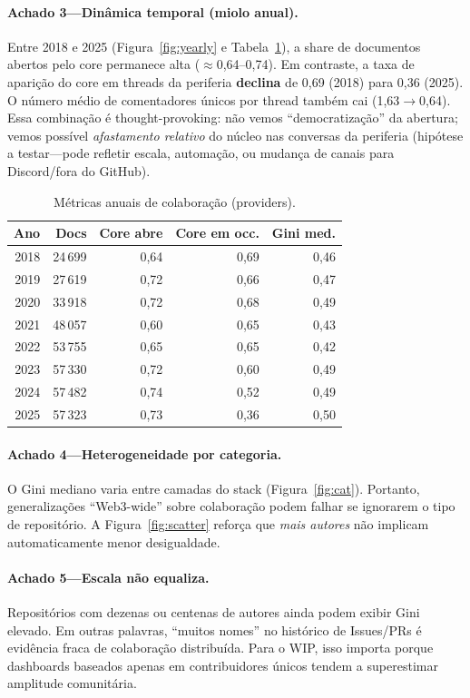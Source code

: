 \documentclass[10pt,conference]{IEEEtran}
\begin{document}
\paragraph{Achado 3---Dinâmica temporal (miolo anual).}
Entre 2018 e 2025 (Figura~\ref{fig:yearly} e Tabela~\ref{tab:yearly}), a share de documentos abertos pelo core permanece alta ($\approx$0,64--0,74). Em contraste, a taxa de aparição do core em threads da periferia \textbf{declina} de 0,69 (2018) para 0,36 (2025). O número médio de comentadores únicos por thread também cai (1,63$\rightarrow$0,64). Essa combinação é thought-provoking: não vemos ``democratização'' da abertura; vemos possível \emph{afastamento relativo} do núcleo nas conversas da periferia (hipótese a testar---pode refletir escala, automação, ou mudança de canais para Discord/fora do GitHub).

\begin{table}[t]
\caption{Métricas anuais de colaboração (providers).}
\label{tab:yearly}
\centering
\scriptsize
\begin{tabular}{@{}rrrrr@{}}
\toprule
Ano & Docs & Core abre & Core em occ. & Gini med. \\
\midrule
2018 & 24\,699 & 0,64 & 0,69 & 0,46 \\
2019 & 27\,619 & 0,72 & 0,66 & 0,47 \\
2020 & 33\,918 & 0,72 & 0,68 & 0,49 \\
2021 & 48\,057 & 0,60 & 0,65 & 0,43 \\
2022 & 53\,755 & 0,65 & 0,65 & 0,42 \\
2023 & 57\,330 & 0,72 & 0,60 & 0,49 \\
2024 & 57\,482 & 0,74 & 0,52 & 0,49 \\
2025 & 57\,323 & 0,73 & 0,36 & 0,50 \\
\bottomrule
\end{tabular}
\end{table}

\paragraph{Achado 4---Heterogeneidade por categoria.}
O Gini mediano varia entre camadas do stack (Figura~\ref{fig:cat}). Portanto, generalizações ``Web3-wide'' sobre colaboração podem falhar se ignorarem o tipo de repositório. A Figura~\ref{fig:scatter} reforça que \emph{mais autores} não implicam automaticamente menor desigualdade.

\paragraph{Achado 5---Escala não equaliza.}
Repositórios com dezenas ou centenas de autores ainda podem exibir Gini elevado. Em outras palavras, ``muitos nomes'' no histórico de Issues/PRs é evidência fraca de colaboração distribuída. Para o WIP, isso importa porque dashboards baseados apenas em contribuidores únicos tendem a superestimar amplitude comunitária.
\end{document}
